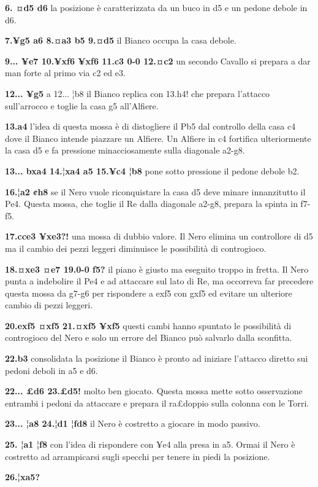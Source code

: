 \textbf{6. ¤d5 d6} la posizione è caratterizzata da un buco in d5 e un
pedone debole in d6.

\textbf{7.¥g5 a6 8.¤a3 b5 9.¤d5} il Bianco occupa la casa debole.

\textbf{9... ¥e7 10.¥xf6 ¥xf6 11.c3 0-0 12.¤c2} un secondo Cavallo si
prepara a dar man forte al primo via c2 ed e3.

\textbf{12... ¥g5} a 12... ¦b8 il Bianco replica con 13.h4! che prepara
l'attacco sull'arrocco e toglie la casa g5 all'Alfiere.

\textbf{13.a4} l'idea di questa mossa è di distogliere il Pb5 dal
controllo della casa c4 dove il Bianco intende piazzare un Alfiere. Un
Alfiere in c4 fortifica ulteriormente la casa d5 e fa pressione
minacciosamente sulla diagonale a2-g8.

\textbf{13... bxa4 14.¦xa4 a5 15.¥c4 ¦b8} pone sotto pressione il pedone
debole b2.

\textbf{16.¦a2 ¢h8} se il Nero vuole riconquistare la casa d5 deve
minare innanzitutto il Pe4. Questa mossa, che toglie il Re dalla
diagonale a2-g8, prepara la spinta in f7-f5.

\textbf{17.cce3 ¥xe3?!} una mossa di dubbio valore. Il Nero elimina un
controllore di d5 ma il cambio dei pezzi leggeri diminuisce le
possibilità di controgioco.

\textbf{18.¤xe3 ¤e7 19.0-0 f5?} il piano è giusto ma eseguito troppo in
fretta. Il Nero punta a indebolire il Pe4 e ad attaccare sul lato di Re,
ma occorreva far precedere questa mossa da g7-g6 per rispondere a exf5
con gxf5 ed evitare un ulteriore cambio di pezzi leggeri.

\textbf{20.exf5 ¤xf5 21.¤xf5 ¥xf5} questi cambi hanno spuntato le
possibilità di controgioco del Nero e solo un errore del Bianco può
salvarlo dalla sconfitta.

\textbf{22.b3} consolidata la posizione il Bianco è pronto ad iniziare
l'attacco diretto sui pedoni deboli in a5 e d6.

\textbf{22... £d6 23.£d5!} molto ben giocato. Questa mossa mette sotto
osservazione entrambi i pedoni da attaccare e prepara il ra£doppio sulla
colonna con le Torri.

\textbf{23... ¦a8 24.¦d1 ¦fd8} il Nero è costretto a giocare in modo
passivo.

\textbf{25. ¦a1 ¦f8} con l'idea di rispondere con ¥e4 alla presa in a5.
Ormai il Nero è costretto ad arrampicarsi sugli specchi per tenere in
piedi la posizione.

\textbf{26.¦xa5?}

